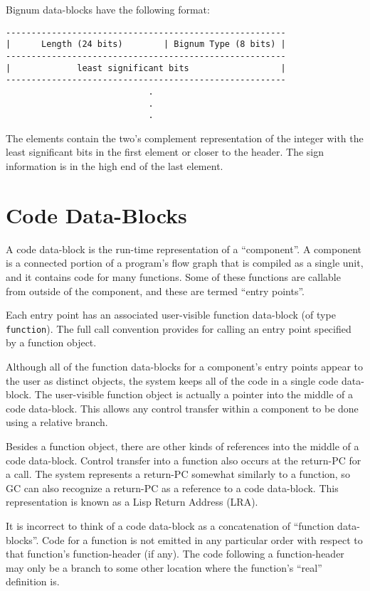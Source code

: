 Bignum data-blocks have the following format:
\begin{verbatim}
-------------------------------------------------------
|      Length (24 bits)        | Bignum Type (8 bits) |
-------------------------------------------------------
|             least significant bits                  |
-------------------------------------------------------
                            .
                            .
                            .
\end{verbatim}
The elements contain the two's complement representation of the integer with
the least significant bits in the first element or closer to the header.  The
sign information is in the high end of the last element.




\section{Code Data-Blocks}

A code data-block is the run-time representation of a ``component''.  A component
is a connected portion of a program's flow graph that is compiled as a single
unit, and it contains code for many functions.  Some of these functions are
callable from outside of the component, and these are termed ``entry points''.

Each entry point has an associated user-visible function data-block (of type
{\tt function}).  The full call convention provides for calling an entry point
specified by a function object.

Although all of the function data-blocks for a component's entry points appear
to the user as distinct objects, the system keeps all of the code in a single
code data-block.  The user-visible function object is actually a pointer into
the middle of a code data-block.  This allows any control transfer within a
component to be done using a relative branch.

Besides a function object, there are other kinds of references into the middle
of a code data-block.  Control transfer into a function also occurs at the
return-PC for a call.  The system represents a return-PC somewhat similarly to
a function, so GC can also recognize a return-PC as a reference to a code
data-block.  This representation is known as a Lisp Return Address (LRA).

It is incorrect to think of a code data-block as a concatenation of ``function
data-blocks''.  Code for a function is not emitted in any particular order with
respect to that function's function-header (if any).  The code following a
function-header may only be a branch to some other location where the
function's ``real'' definition is.


